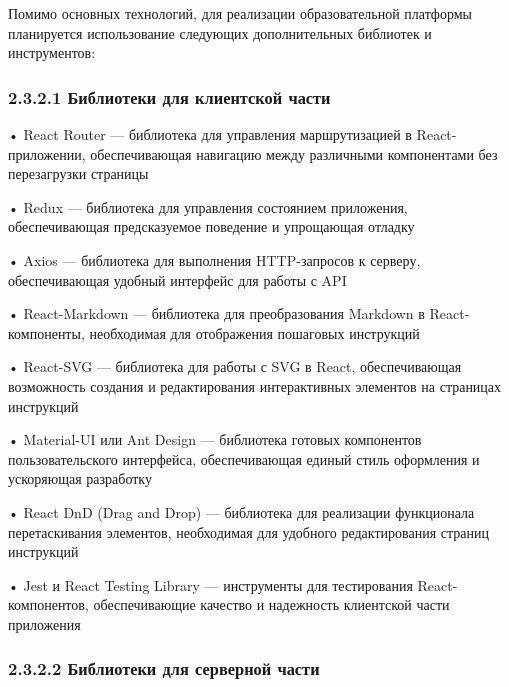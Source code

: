 \subtitlespace

{\gostFont

  \par \redline Помимо основных технологий, для реализации образовательной платформы планируется использование следующих дополнительных библиотек и инструментов:

  \subsubsection*{2.3.2.1 Библиотеки для клиентской части}

  \par \redline • React Router — библиотека для управления маршрутизацией в React-приложении, обеспечивающая навигацию между различными компонентами без перезагрузки страницы
  \par \redline • Redux — библиотека для управления состоянием приложения, обеспечивающая предсказуемое поведение и упрощающая отладку
  \par \redline • Axios — библиотека для выполнения HTTP-запросов к серверу, обеспечивающая удобный интерфейс для работы с API
  \par \redline • React-Markdown — библиотека для преобразования Markdown в React-компоненты, необходимая для отображения пошаговых инструкций
  \par \redline • React-SVG — библиотека для работы с SVG в React, обеспечивающая возможность создания и редактирования интерактивных элементов на страницах инструкций
  \par \redline • Material-UI или Ant Design — библиотека готовых компонентов пользовательского интерфейса, обеспечивающая единый стиль оформления и ускоряющая разработку
  \par \redline • React DnD (Drag and Drop) — библиотека для реализации функционала перетаскивания элементов, необходимая для удобного редактирования страниц инструкций
  \par \redline • Jest и React Testing Library — инструменты для тестирования React-компонентов, обеспечивающие качество и надежность клиентской части приложения

  \subsubsection*{2.3.2.2 Библиотеки для серверной части}

}
